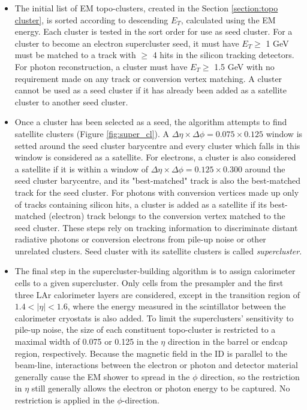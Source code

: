 \documentclass[a4paper, oneside, 11pt, openright]{book}
\begin{document}
			\begin{itemize}
				\item The initial list of EM topo-clusters, created in the Section \ref{section:topo cluster}, is sorted according to descending $E_T$, calculated using the EM energy. Each cluster is tested in the sort order for use as seed cluster. For a cluster to become an electron supercluster seed, it must have $E_T \geq$ 1 GeV must be matched to a track with $\geq$ 4 hits in the silicon tracking detectors. For
				photon reconstruction, a cluster must have $E_T \geq$ 1.5 GeV with no requirement made on any track or conversion vertex matching. A cluster cannot be used as a seed cluster if it has already been added as a satellite cluster to another seed cluster.
				\item Once a cluster has been selected as a seed, the algorithm attempts to find satellite clusters (Figure \ref{fig:super_cl}). A $\Delta\eta\times\Delta\phi = 0.075 \times 0.125$ window is setted around the seed cluster barycentre and every cluster which falls in this window is considered as a satellite. For electrons, a cluster is also considered a satellite if it is within a window of $\Delta\eta\times\Delta\phi = 0.125 \times 0.300$ around the seed cluster barycentre, and its "best-matched" track is also the best-matched track for the seed cluster. For photons with conversion vertices made up only of tracks containing silicon hits, a cluster is added as a satellite if its best-matched (electron) track belongs to the conversion vertex matched to the seed cluster. These steps rely on tracking information to discriminate distant radiative photons or conversion electrons from pile-up noise or other unrelated clusters. Seed cluster with its satellite clusters is called \textit{supercluster}.
				\item The final step in the
				supercluster-building algorithm is to assign calorimeter cells to a given supercluster. Only cells from the presampler and the first three LAr calorimeter layers are considered, except in the transition region of $1.4 < |\eta| < 1.6$, where the energy measured in the scintillator between the calorimeter cryostats is also added. To limit the superclusters’ sensitivity to pile-up noise, the size of each constituent topo-cluster is restricted to a maximal width of 0.075 or 0.125 in the $\eta$ direction in the barrel or endcap region, respectively. Because the magnetic field in the ID is parallel to the beam-line, interactions between the electron or photon and detector material generally cause the EM shower to spread in the $\phi$ direction, so the restriction in $\eta$ still generally allows the electron or photon energy to be captured. No restriction is applied in the $\phi$-direction.
			\end{itemize}
			
\end{document}
